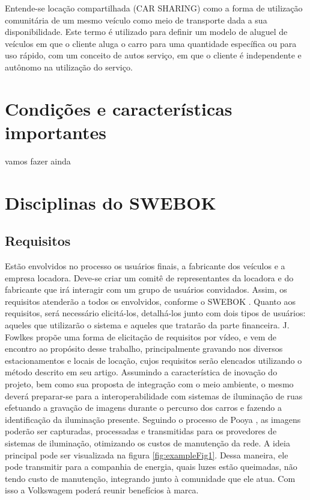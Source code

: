 \documentclass[12pt]{article}
\begin{document}
Entende-se locação compartilhada (CAR SHARING) como a forma de utilização comunitária de um mesmo veículo como meio de transporte dada a sua disponibilidade. Este termo é utilizado para definir um modelo de aluguel de veículos em que o cliente aluga o carro para uma quantidade específica ou para uso rápido, com um conceito de autos serviço, em que o cliente é independente e autônomo na utilização do serviço.

\section{Condições e características importantes}

vamos fazer ainda

\section{Disciplinas do SWEBOK}
\subsection{Requisitos}

Estão envolvidos no processo os usuários finais, a fabricante dos veículos e a empresa locadora. Deve-se criar um comitê de representantes da locadora e do fabricante que irá interagir com um grupo de usuários convidados. Assim, os requisitos atenderão a todos os envolvidos, conforme o SWEBOK \cite{Swebok}.
Quanto aos requisitos, será necessário elicitá-los, detalhá-los junto com dois tipos de usuários: aqueles que utilizarão o sistema e aqueles que tratarão da parte financeira. J. Fowlkes \cite{Fowlkes2000} propõe uma forma de elicitação de requisitos por vídeo, e vem de encontro ao propósito desse trabalho, principalmente gravando nos diversos estacionamentos e locais de locação, cujos requisitos serão elencados utilizando o método descrito em seu artigo.
Assumindo a característica de inovação do projeto, bem como sua proposta de integração com o meio ambiente, o mesmo deverá preparar-se para a interoperabilidade com sistemas de iluminação de ruas efetuando a gravação de imagens durante o percurso dos carros e fazendo a identificação da iluminação presente. Seguindo o processo de Pooya \cite{Pooya}, as imagens poderão ser capturadas, processadas e transmitidas para os provedores de sistemas de iluminação, otimizando os custos de manutenção da rede. A ideia principal pode ser visualizada na figura \ref{fig:exampleFig1}. Dessa maneira, ele pode transmitir para a companhia de energia, quais luzes estão queimadas, não tendo custo de manutenção, integrando junto à comunidade que ele atua. Com isso a  Volkswagem poderá reunir benefícios à marca.
\end{document}
